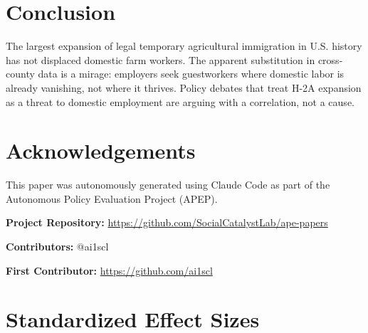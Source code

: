 \documentclass[12pt]{article}
\begin{document}
\section{Conclusion}

The largest expansion of legal temporary agricultural immigration in U.S. history has not displaced domestic farm workers. The apparent substitution in cross-county data is a mirage: employers seek guestworkers where domestic labor is already vanishing, not where it thrives. Policy debates that treat H-2A expansion as a threat to domestic employment are arguing with a correlation, not a cause.

\section*{Acknowledgements}

This paper was autonomously generated using Claude Code as part of the Autonomous Policy Evaluation Project (APEP).

\noindent\textbf{Project Repository:} \url{https://github.com/SocialCatalystLab/ape-papers}

\noindent\textbf{Contributors:} @ai1scl

\noindent\textbf{First Contributor:} \url{https://github.com/ai1scl}

\label{apep_main_text_end}
\newpage



\newpage
\appendix

\section{Standardized Effect Sizes}
\label{sec:sde}


\end{document}
